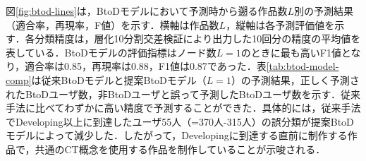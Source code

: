 \documentclass[submit]{ipsj}
\begin{document}
\begin{table}[t]
{\begin{tabular}{r|rp{60mm}|rp{60mm}}
        \end{tabular}
    }
    \vspace{-4mm}
\end{table}

図\ref{fig:btod-lines}は，BtoDモデルにおいて予測時から遡る作品数$L$別の予測結果（適合率，再現率，F値）を示す．横軸は作品数$L$，縦軸は各予測評価値を示す．各分類精度は，層化10分割交差検証により出力した10回分の精度の平均値を表している．BtoDモデルの評価指標はノード数$L=1$のときに最も高いF1値となり，適合率は0.85，再現率は0.88，F1値は0.87であった．表\ref{tab:btod-model-comp}は従来BtoDモデルと提案BtoDモデル（$L=1$）の予測結果，正しく予測されたBtoDユーザ数，非BtoDユーザと誤って予測したBtoDユーザ数を示す．従来手法に比べてわずかに高い精度で予測することができた．具体的には，従来手法でDeveloping以上に到達したユーザ55人（=370人-315人）の誤分類が提案BtoDモデルによって減少した．したがって，Developingに到達する直前に制作する作品で，共通のCT概念を使用する作品を制作していることが示唆される．
\end{document}

